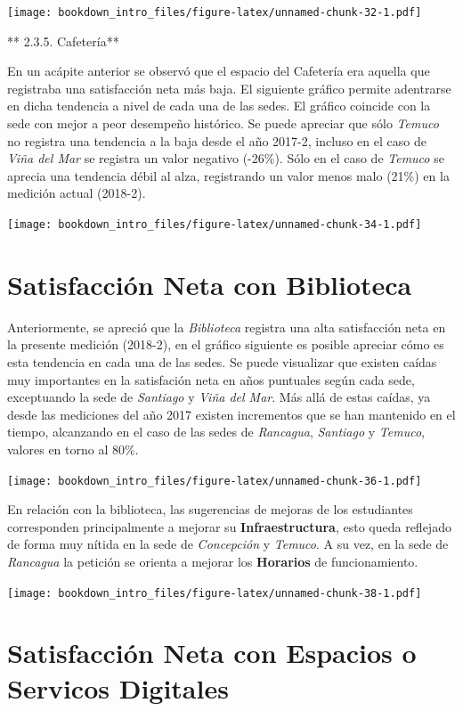 \documentclass[]{book}
\begin{document}
\texttt{[image: bookdown\_intro\_files/figure-latex/unnamed-chunk-32-1.pdf]}

** 2.3.5. Cafetería**

En un acápite anterior se observó que el espacio del Cafetería era
aquella que registraba una satisfacción neta más baja. El siguiente
gráfico permite adentrarse en dicha tendencia a nivel de cada una de las
sedes. El gráfico coincide con la sede con mejor a peor desempeño
histórico. Se puede apreciar que sólo \emph{Temuco} no registra una
tendencia a la baja desde el año 2017-2, incluso en el caso de
\emph{Viña del Mar} se registra un valor negativo (-26\%). Sólo en el
caso de \emph{Temuco} se aprecia una tendencia débil al alza,
registrando un valor menos malo (21\%) en la medición actual (2018-2).

\texttt{[image: bookdown\_intro\_files/figure-latex/unnamed-chunk-34-1.pdf]}

\section{Satisfacción Neta con
Biblioteca}\label{satisfaccion-neta-con-biblioteca}

Anteriormente, se apreció que la \emph{Biblioteca} registra una alta
satisfacción neta en la presente medición (2018-2), en el gráfico
siguiente es posible apreciar cómo es esta tendencia en cada una de las
sedes. Se puede visualizar que existen caídas muy importantes en la
satisfación neta en años puntuales según cada sede, exceptuando la sede
de \emph{Santiago} y \emph{Viña del Mar}. Más allá de estas caídas, ya
desde las mediciones del año 2017 existen incrementos que se han
mantenido en el tiempo, alcanzando en el caso de las sedes de
\emph{Rancagua}, \emph{Santiago} y \emph{Temuco}, valores en torno al
80\%.

\texttt{[image: bookdown\_intro\_files/figure-latex/unnamed-chunk-36-1.pdf]}

En relación con la biblioteca, las sugerencias de mejoras de los
estudiantes corresponden principalmente a mejorar su
\textbf{Infraestructura}, esto queda reflejado de forma muy nítida en la
sede de \emph{Concepción} y \emph{Temuco}. A su vez, en la sede de
\emph{Rancagua} la petición se orienta a mejorar los \textbf{Horarios}
de funcionamiento.

\texttt{[image: bookdown\_intro\_files/figure-latex/unnamed-chunk-38-1.pdf]}

\section{Satisfacción Neta con Espacios o Servicos
Digitales}\label{satisfaccion-neta-con-espacios-o-servicos-digitales}
\end{document}
